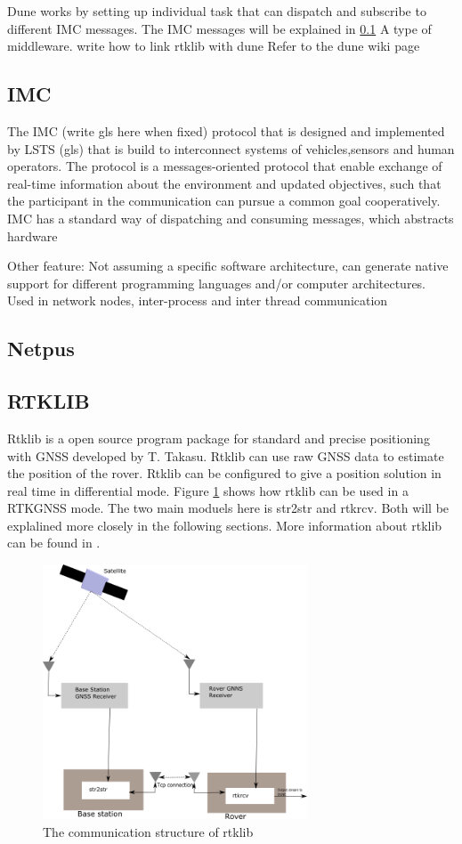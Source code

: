 Dune works by setting up individual task that can dispatch and subscribe to different IMC messages. The IMC messages will be explained in \ref{ss:IMC}
A type of middleware. write how to link rtklib with dune
Refer to the dune wiki page
\subsection{IMC}\label{ss:IMC}
The IMC (write gls here when fixed) protocol that is designed and implemented by LSTS (gls) that is build to interconnect systems of vehicles,sensors and human operators. The protocol is a messages-oriented protocol that enable exchange of real-time information about the environment and updated objectives, such that the participant in the communication can pursue a common goal cooperatively.
IMC has a standard way of dispatching and consuming messages, which abstracts hardware

Other feature: Not assuming a specific software architecture, can generate native support for different programming languages and/or computer architectures. Used in network nodes, inter-process and inter thread communication
\subsection{Netpus}

\subsection{RTKLIB}\label{ss:Rtklib}
Rtklib is a open source program package for standard and precise positioning with GNSS developed by T. Takasu. Rtklib can use raw GNSS data to estimate the position of the rover. Rtklib can be configured to give a position solution in real time in differential mode. Figure \ref{figure:RTKLIB_STRUCTURE} shows how rtklib can be used in a RTKGNSS mode. The two main moduels here is str2str and rtkrcv. Both will be explalined more closely in the following sections. More information about  rtklib can be found in \citep{Rtklib242}.

\begin{figure}[H]
	\centering
		\includegraphics[width=0.7\textwidth]{figs/Rtklib_structure.png}
		\caption{The communication structure of rtklib}
		\label{figure:RTKLIB_STRUCTURE}
\end{figure}
